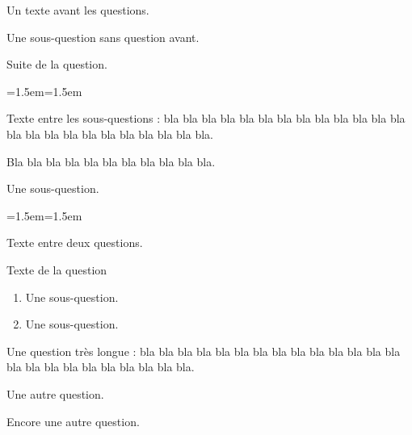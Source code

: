 \documentclass{article}
\makeatletter
\newenvironment{questions}
      {\begin{enumerate}[label=\arabic*.]}
      {\end{enumerate}}
\newenvironment{sousquestions}
      {\begin{enumerate}[label=(\alph*)]}
      {\end{enumerate}}
\newenvironment{horsquestions}
      {\begin{list}{}{\@totalleftmargin=0cm\leftmargin=0cm\rightmargin=0cm
                      \itemindent=1.5em\listparindent=1.5em}\item}
      {\end{list}}
\makeatother
\begin{document}
    Un texte avant les questions.
    \begin{questions}
        \item
        \begin{sousquestions}
            \item Une sous-question sans question avant.

    Suite de la question.
        \begin{horsquestions}
        Texte entre les sous-questions : bla bla bla bla bla bla bla bla bla bla bla bla bla bla bla bla bla bla bla bla bla bla bla bla.

        Bla bla bla bla bla bla bla bla bla bla bla.
        \end{horsquestions}
            \item Une sous-question.
        \end{sousquestions}
        \begin{horsquestions}
        Texte entre deux questions.
        \end{horsquestions}
        \item Texte de la question
        \begin{sousquestions}
            \item Une sous-question.
            \item Une sous-question.
        \end{sousquestions}
        \item Une question très longue : bla bla bla bla bla bla bla bla bla bla bla bla bla bla bla bla bla bla bla bla bla bla bla bla.
        \item Une autre question.
        \item Encore une autre question.
    \end{questions}

    
\end{document}
